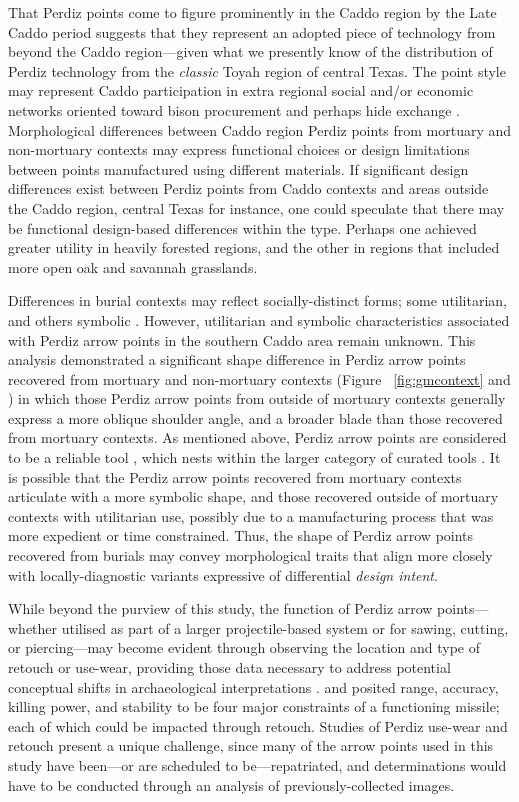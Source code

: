 \documentclass[review]{elsarticle}
\begin{document}
That Perdiz points come to figure prominently in the Caddo region by the Late Caddo period suggests that they represent an adopted piece of technology from beyond the Caddo region—given what we presently know of the distribution of Perdiz technology from the \textit{classic} Toyah region of central Texas. The point style may represent Caddo participation in extra regional social and/or economic networks oriented toward bison procurement and perhaps hide exchange \citep{RN9002}. Morphological differences between Caddo region Perdiz points from mortuary and non-mortuary contexts may express functional choices or design limitations between points manufactured using different materials. If significant design differences exist between Perdiz points from Caddo contexts and areas outside the Caddo region, central Texas for instance, one could speculate that there may be functional design-based differences within the type. Perhaps one achieved greater utility in heavily forested regions, and the other in regions that included more open oak and savannah grasslands.

Differences in burial contexts may reflect socially-distinct forms; some utilitarian, and others symbolic \citep[69]{RN8989}. However, utilitarian and symbolic characteristics associated with Perdiz arrow points in the southern Caddo area remain unknown. This analysis demonstrated a significant shape difference in Perdiz arrow points recovered from mortuary and non-mortuary contexts (Figure ~\ref{fig:gmcontext} and \citealt{RN8980}) in which those Perdiz arrow points from outside of mortuary contexts generally express a more oblique shoulder angle, and a broader blade than those recovered from mortuary contexts. As mentioned above, Perdiz arrow points are considered to be a reliable tool \citep{RN5873}, which nests within the larger category of curated tools \citep{RN5880}. It is possible that the Perdiz arrow points recovered from mortuary contexts articulate with a more symbolic shape, and those recovered outside of mortuary contexts with utilitarian use, possibly due to a manufacturing process that was more expedient or time constrained. Thus, the shape of Perdiz arrow points recovered from burials may convey morphological traits that align more closely with locally-diagnostic variants expressive of differential \textit{design intent}.

While beyond the purview of this study, the function of Perdiz arrow points---whether utilised as part of a larger projectile-based system or for sawing, cutting, or piercing---may become evident through observing the location and type of retouch or use-wear, providing those data necessary to address potential conceptual shifts in archaeological interpretations \citep{RN8990,RN8991,RN8992,RN6342}. \citet{RN8994} and \citet{RN8993} posited range, accuracy, killing power, and stability to be four major constraints of a functioning missile; each of which could be impacted through retouch. Studies of Perdiz use-wear and retouch present a unique challenge, since many of the arrow points used in this study have been---or are scheduled to be---repatriated, and determinations would have to be conducted through an analysis of previously-collected images.
\end{document}
